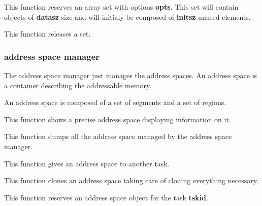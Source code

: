 
This function reserves an array set with options \textbf{opts}. This
set will contain objects of \textbf{datasz} size and will initialy
be composed of \textbf{initsz} unused elements.


This function releases a set.

%
%

\subsubsection{address space manager}

The address space manager just manages the address spaces. An address
space is a container describing the addressable memory.

An address space is composed of a set of segments and a set of regions.


This function shows a precise address space displaying information
on it.


This function dumps all the address space managed by the address
space manager.


This function gives an address space to another task.


This function clones an address space taking care of cloning everything
necessary.


This function reserves an address space object for the task \textbf{tskid}.

